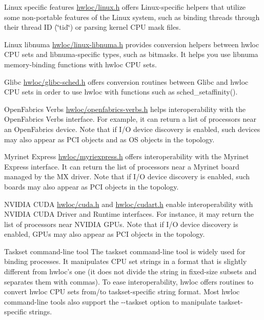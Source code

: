 \begin{DoxyDescription}
\item[Linux specific features ]\hyperlink{a00035_source}{hwloc/linux.h} offers Linux-\/specific helpers that utilize some non-\/portable features of the Linux system, such as binding threads through their thread ID (\char`\"{}tid\char`\"{}) or parsing kernel CPU mask files. 


\item[Linux libnuma ]\hyperlink{a00034_source}{hwloc/linux-\/libnuma.h} provides conversion helpers between hwloc CPU sets and libnuma-\/specific types, such as bitmasks. It helps you use libnuma memory-\/binding functions with hwloc CPU sets. 


\item[Glibc ]\hyperlink{a00030_source}{hwloc/glibc-\/sched.h} offers conversion routines between Glibc and hwloc CPU sets in order to use hwloc with functions such as sched\_\-setaffinity(). 


\item[OpenFabrics Verbs ]\hyperlink{a00037_source}{hwloc/openfabrics-\/verbs.h} helps interoperability with the OpenFabrics Verbs interface. For example, it can return a list of processors near an OpenFabrics device. Note that if I/O device discovery is enabled, such devices may also appear as PCI objects and as OS objects in the topology. 


\item[Myrinet Express ]\hyperlink{a00036_source}{hwloc/myriexpress.h} offers interoperability with the Myrinet Express interface. It can return the list of processors near a Myrinet board managed by the MX driver. Note that if I/O device discovery is enabled, such boards may also appear as PCI objects in the topology. 


\item[NVIDIA CUDA ]\hyperlink{a00028_source}{hwloc/cuda.h} and \hyperlink{a00029_source}{hwloc/cudart.h} enable interoperability with NVIDIA CUDA Driver and Runtime interfaces. For instance, it may return the list of processors near NVIDIA GPUs. Note that if I/O device discovery is enabled, GPUs may also appear as PCI objects in the topology. 


\item[Taskset command-\/line tool ]The taskset command-\/line tool is widely used for binding processes. It manipulates CPU set strings in a format that is slightly different from hwloc's one (it does not divide the string in fixed-\/size subsets and separates them with commas). To ease interoperability, hwloc offers routines to convert hwloc CPU sets from/to taskset-\/specific string format. Most hwloc command-\/line tools also support the -\/-\/taskset option to manipulate taskset-\/specific strings. 


\end{DoxyDescription}
